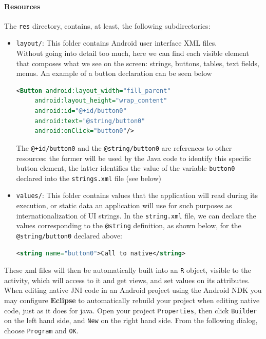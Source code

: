 \documentclass[a4paper,10pt]{article}
\newcommand{\keyword}[1]{\texttt{#1}}
\begin{document}
\begin{multicols}{2}
\paragraph{Resources}
The \keyword{res} directory, contains, at least, the following subdirectories:
\begin{itemize}
\item \keyword{layout/}: This folder contains Android user interface XML files.\\
Without going into detail too much, here we can find each visible element that composes what we see on the screen: strings, buttons, tables, text fields, menus. An example of a button declaration can be seen below
\begin{lstlisting}[language=XML,
				   columns=fullflexible,
				   showstringspaces=false,
				   commentstyle=\color{gray}\upshape]
<Button android:layout_width="fill_parent"
	 android:layout_height="wrap_content"
	 android:id="@+id/button0"
	 android:text="@string/button0"
	 android:onClick="button0"/>
\end{lstlisting}
The \keyword{@+id/button0} and the \keyword{@string/button0} are references to other resources: the former will be used by the Java code to identify this specific button element, the latter identifies the value of the variable \keyword{button0} declared into the \keyword{strings.xml} file (see below)
\item \keyword{values/}: This folder contains values that the application will read during its execution, or static data an application will use for such purposes as internationalization of UI strings. In the \keyword{string.xml} file, we can declare the values corresponding to the \keyword{@string} definition, as shown below, for the \keyword{@string/button0} declared above:
\begin{lstlisting}[language=XML,
				   columns=fullflexible,
				   showstringspaces=false,
				   commentstyle=\color{gray}\upshape]
<string name="button0">Call to native</string>
\end{lstlisting}
\end{itemize}
These xml files will then be automatically built into an \keyword{R} object, visible to the activity, which will access to it and get views, and set values on its attributes.\\
When editing native JNI code in an Android project using the Android NDK you may
configure \textbf{Eclipse} to automatically rebuild your project when editing native code,
just as it does for java. Open your project \texttt{Properties}, then click \texttt{Builder} on the left hand side, and \texttt{New} on the right hand side. From the following dialog, choose \texttt{Program} and \texttt{OK}.\\

\end{multicols}
\end{document}
